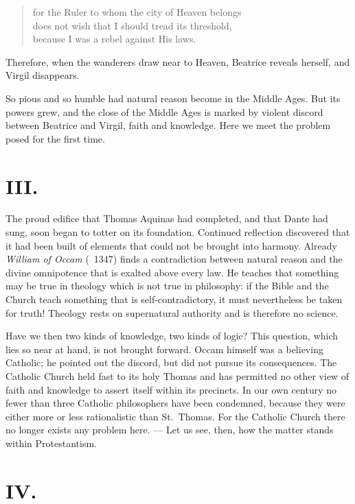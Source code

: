 \documentclass[12pt,a4paper,openany]{book}
\newcommand{\opage}[1]{\marginnote{\footnotesize\textit{[#1]}}}
\begin{document}
\begin{verse}
for the Ruler to whom the city of Heaven belongs \\
does not wish that I should tread its threshold, \\
because I was a rebel against His laws.
\end{verse}

Therefore, when the wanderers draw near to Heaven, Beatrice reveals herself,
and Virgil disappears.

\opage{198}So pious and so humble had natural reason become in the Middle Ages. But its
powers grew, and the close of the Middle Ages is marked by violent discord
between Beatrice and Virgil, faith and knowledge. Here we meet the problem
posed for the first time.

\section*{III.}

The proud edifice that Thomas Aquinas had completed, and that Dante had sung,
soon began to totter on its foundation. Continued reflection discovered that
it had been built of elements that could not be brought into harmony. Already
\emph{William of Occam} (\dag\ 1347) finds a contradiction between natural reason and
the divine omnipotence that is exalted above every law. He teaches that
something may be true in theology which is not true in philosophy: if the
Bible and the Church teach something that is self-contradictory, it must
nevertheless be taken for truth! Theology rests on supernatural authority and
is therefore no science.

Have we then two kinds of knowledge, two kinds of logic? This question, which
lies so near at hand, is not brought forward. Occam himself was a believing
Catholic; he pointed out the discord, but did not pursue its consequences. The
Catholic Church held fast to its holy Thomas and has permitted no other view
of faith and knowledge to assert itself within its precincts. In our own
century no fewer than three Catholic philosophers have been condemned, because
they were either more or less rationalistic than St.~Thomas. For the Catholic
Church there no longer exists any problem here. --- Let us see, then, how the
matter stands within Protestantism.

\section*{IV.}
\end{document}
